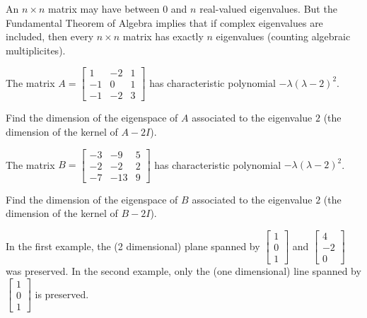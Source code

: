 \begin{applicationActivities}{4}{28}
\begin{observation}
  An \(n\times n\) matrix may have  between \(0\) and \(n\)
  real-valued eigenvalues. But the Fundamental Theorem of Algebra implies that if complex eigenvalues are included,
  then every \(n\times n\) matrix has exactly \(n\) eigenvalues (counting
  algebraic multiplicites).



\end{observation}

\begin{activity}{5}
  The matrix
  $A=\begin{bmatrix} 1 & -2 & 1 \\ -1 & 0 & 1 \\ -1 & -2 & 3\end{bmatrix}$
  has characteristic polynomial \(-\lambda(\lambda-2)^2\).

  Find the dimension of the eigenspace of $A$ associated to the
  eigenvalue $2$ (the dimension of the kernel of \(A-2I\)).
\end{activity}

\begin{activity}{5}
  The matrix
  $B=\begin{bmatrix} -3 & -9 & 5 \\ -2 & -2 & 2 \\ -7 & -13 & 9 \end{bmatrix}$
  has characteristic polynomial \(-\lambda(\lambda-2)^2\).

  Find the dimension of the eigenspace of $B$ associated to the
  eigenvalue $2$ (the dimension of the kernel of \(B-2I\)).
\end{activity}

\begin{observation}
In the first example, the (2 dimensional) plane spanned by $\begin{bmatrix} 1 \\ 0 \\ 1\end{bmatrix}$ and $\begin{bmatrix} 4 \\ -2 \\ 0 \end{bmatrix}$ was preserved.  In the second example, only the (one dimensional) line spanned by $\begin{bmatrix} 1 \\ 0 \\ 1\end{bmatrix}$ is preserved. 
\end{observation}


\end{applicationActivities}
